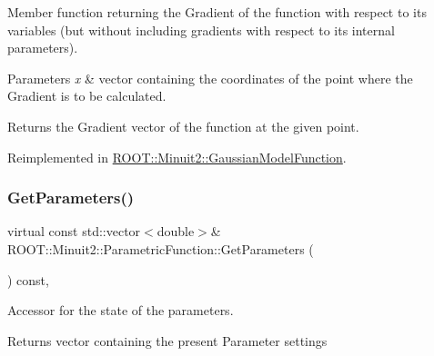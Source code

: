 Member function returning the Gradient of the function with respect to its variables (but without including gradients with respect to its internal parameters).


\begin{DoxyParams}{Parameters}
{\em x} & vector containing the coordinates of the point where the Gradient is to be calculated.\\
\hline
\end{DoxyParams}
\begin{DoxyReturn}{Returns}
the Gradient vector of the function at the given point. 
\end{DoxyReturn}


Reimplemented in \mbox{\hyperlink{classROOT_1_1Minuit2_1_1GaussianModelFunction_ac81a3c5531a291b8a9c3af533de07195}{R\+O\+O\+T\+::\+Minuit2\+::\+Gaussian\+Model\+Function}}.

\mbox{\label{classROOT_1_1Minuit2_1_1ParametricFunction_ac3e70b4d9b0cbe60c529823f6a612a5e}} 
\subsubsection{\texorpdfstring{GetParameters()}{GetParameters()}\hspace{0.1cm}{\footnotesize\ttfamily [1/2]}}
{\footnotesize\ttfamily virtual const std\+::vector$<$double$>$\& R\+O\+O\+T\+::\+Minuit2\+::\+Parametric\+Function\+::\+Get\+Parameters (\begin{DoxyParamCaption}{ }\end{DoxyParamCaption}) const\hspace{0.3cm}{\ttfamily [inline]}, {\ttfamily [virtual]}}

Accessor for the state of the parameters.

\begin{DoxyReturn}{Returns}
vector containing the present Parameter settings 
\end{DoxyReturn}
\mbox{\label{classROOT_1_1Minuit2_1_1ParametricFunction_ac3e70b4d9b0cbe60c529823f6a612a5e}} 
